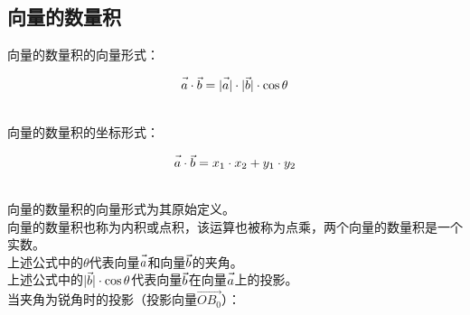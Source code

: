 \documentclass[UTF8]{ctexart}
\let\nvec\vec
\def\vec#1{\nvec{\vphantom b\smash{#1}}}
\begin{document}
\newpage

\subsection{向量的数量积}
    \setcounter{equation}{0}
    向量的数量积的向量形式：
    \begin{large}
        \begin{equation*}
            \vec{a}\cdot\vec{b}=|\vec{a}|\cdot|\vec{b}|\cdot\cos\theta
        \end{equation*}
    \end{large}\\
    向量的数量积的坐标形式：
    \begin{large}
        \begin{equation*}
            \vec{a}\cdot\vec{b}=x_1\cdot x_2+y_1\cdot y_2
        \end{equation*}
    \end{large}\\
    向量的数量积的向量形式为其原始定义。\\[3mm]
    向量的数量积也称为内积或点积，该运算也被称为点乘，两个向量的数量积是一个实数。\\[6mm]
    上述公式中的$\theta$代表向量$\vec{a}$和向量$\vec{b}$的夹角。\\[3mm]
    上述公式中的$|\vec{b}|\cdot\cos{\theta}$代表向量$\vec{b}$在向量$\vec{a}$上的投影。\\[3mm]
    当夹角为锐角时的投影（投影向量$\overrightarrow{OB_0}$）：
\end{document}
